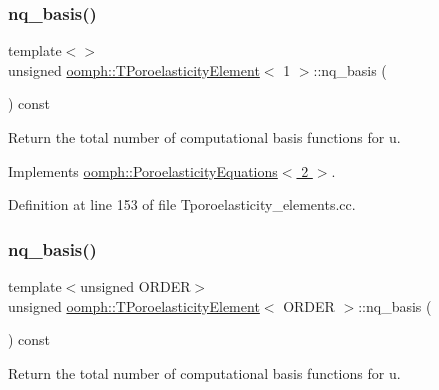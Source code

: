 \subsubsection{\texorpdfstring{nq\+\_\+basis()}{nq\_basis()}\hspace{0.1cm}{\footnotesize\ttfamily [2/3]}}
{\footnotesize\ttfamily template$<$$>$ \\
unsigned \hyperlink{classoomph_1_1TPoroelasticityElement}{oomph\+::\+T\+Poroelasticity\+Element}$<$ 1 $>$\+::nq\+\_\+basis (\begin{DoxyParamCaption}{ }\end{DoxyParamCaption}) const\hspace{0.3cm}{\ttfamily [virtual]}}



Return the total number of computational basis functions for u. 



Implements \hyperlink{classoomph_1_1PoroelasticityEquations_aec90144cc61d817c97bee414e90921af}{oomph\+::\+Poroelasticity\+Equations$<$ 2 $>$}.



Definition at line 153 of file Tporoelasticity\+\_\+elements.\+cc.

\mbox{\label{classoomph_1_1TPoroelasticityElement_afdb47aa5ae5af5ddcc4bf3d1fbd4b066}} 
\subsubsection{\texorpdfstring{nq\+\_\+basis()}{nq\_basis()}\hspace{0.1cm}{\footnotesize\ttfamily [3/3]}}
{\footnotesize\ttfamily template$<$unsigned O\+R\+D\+ER$>$ \\
unsigned \hyperlink{classoomph_1_1TPoroelasticityElement}{oomph\+::\+T\+Poroelasticity\+Element}$<$ O\+R\+D\+ER $>$\+::nq\+\_\+basis (\begin{DoxyParamCaption}{ }\end{DoxyParamCaption}) const\hspace{0.3cm}{\ttfamily [virtual]}}



Return the total number of computational basis functions for u. 



